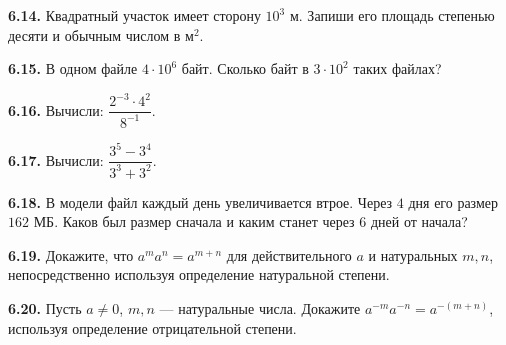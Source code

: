 \noindent\begin{minipage}[t]{\linewidth}\textbf{6.14.} Квадратный участок имеет сторону \(10^{3}\) м. Запиши его площадь степенью десяти и обычным числом в м\(^{2}\).\par\end{minipage}\par
\noindent\begin{minipage}[t]{\linewidth}\textbf{6.15.} В одном файле \(4 \cdot  10^{6}\) байт. Сколько байт в \(3 \cdot  10^{2}\) таких файлах?\par\end{minipage}\par
\noindent\begin{minipage}[t]{\linewidth}\textbf{6.16.}\starmark{} Вычисли: \(\dfrac{2^{- 3} \cdot  4^{2}}{8^{- 1}}\).\par\end{minipage}\par
\noindent\begin{minipage}[t]{\linewidth}\textbf{6.17.}\starmark{} Вычисли: \(\dfrac{3^{5} - 3^{4}}{3^{3} + 3^{2}}\).\par\end{minipage}\par
\noindent\begin{minipage}[t]{\linewidth}\textbf{6.18.}\starmark{} В модели файл каждый день увеличивается втрое. Через \(4\) дня его размер \(162\) МБ. Каков был размер сначала и каким станет через \(6\) дней от начала?\par\end{minipage}\par
\noindent\begin{minipage}[t]{\linewidth}\textbf{6.19.} Докажите, что \(a^m a^n=a^{m+n}\) для действительного \(a\) и натуральных \(m,n\), непосредственно используя определение натуральной степени.\par\end{minipage}\par
\noindent\begin{minipage}[t]{\linewidth}\textbf{6.20.} Пусть \(a\neq0\), \(m,n\) — натуральные числа. Докажите \(a^{-m}a^{-n}=a^{-(m+n)}\), используя определение отрицательной степени.\par\end{minipage}\par
\endgroup
